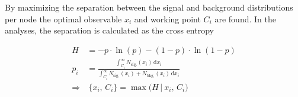 
By maximizing the separation between the signal and background distributions per node the optimal observable $x_{i}$ and working point $C_{i}$  are found. In the analyses, the separation is calculated as the cross entropy 

\begin{align}
H&=-p\cdot\ln(p)-(1-p)\cdot\ln(1-p)\\ p_{i}&=\frac{\int_{C_{i}}^{\infty} N_\mathrm{sig.}(x_{i})\,\mathrm{d}x_{i}}{\int_{C_{i}}^{\infty} N_\mathrm{sig.}(x_{i})+N_\mathrm{bkg.}(x_{i})\,\mathrm{d}x_{i}}\\
\Rightarrow &~\{x_{i},\,C_{i}\}=\max\Big(H\,\big|~x_{i},\,C_{i}\Big)
\end{align}

